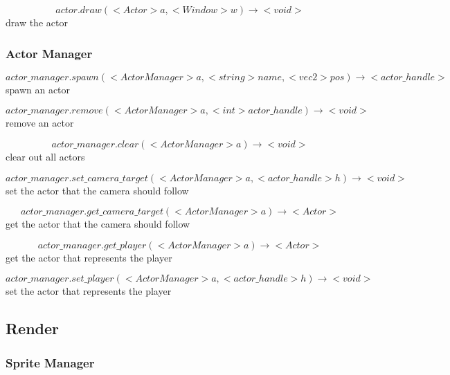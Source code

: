 \documentclass[11pt,fleqn]{book} %
\begin{document}
\begin{equation}
actor.draw(<Actor> a, <Window> w) \rightarrow <void>
\end{equation}
draw the actor

\subsubsection{Actor Manager}

\begin{equation}
actor\_manager.spawn(<ActorManager> a, <string> name, <vec2> pos) \rightarrow <actor\_handle>
\end{equation}
spawn an actor

\begin{equation}
actor\_manager.remove(<ActorManager> a, <int> actor\_handle) \rightarrow <void>
\end{equation}
remove an actor

\begin{equation}
actor\_manager.clear(<ActorManager> a) \rightarrow <void>
\end{equation}
clear out all actors

\begin{equation}
actor\_manager.set\_camera\_target(<ActorManager> a, <actor\_handle> h) \rightarrow <void>
\end{equation}
set the actor that the camera should follow

\begin{equation}
actor\_manager.get\_camera\_target(<ActorManager> a) \rightarrow <Actor>
\end{equation}
get the actor that the camera should follow

\begin{equation}
actor\_manager.get\_player(<ActorManager> a) \rightarrow <Actor>
\end{equation}
get the actor that represents the player

\begin{equation}
actor\_manager.set\_player(<ActorManager> a, <actor\_handle> h) \rightarrow <void>
\end{equation}
set the actor that represents the player

\subsection{Render}
\subsubsection{Sprite Manager}
\end{document}
